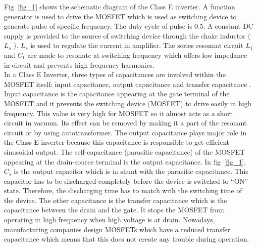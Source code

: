 \documentclass[journal,twoside]{IEEEtran}
\begin{document}
Fig~\ref{fig_1} shows the schematic diagram of the Class E inverter. A
function generator is used to drive the MOSFET which is
used as switching device to generate pulse of specific
frequency. The duty cycle of pulse is 0.5. A constant DC
supply is provided to the source of switching device through
the choke inductor ($L_s$ ). $L_s$ is used to regulate the current in
amplifier. The series resonant circuit $L_1$ and $C_1$ are made to
resonate at switching frequency which offers low impedance
in circuit and prevents high frequency harmonics.\\
In a Class E Inverter, three types of capacitances are involved
within the MOSFET itself:
input capacitance, output
capacitance and transfer capacitance \cite{ClassRadio}. Input capacitance is
the capacitance appearing at the gate terminal of the
MOSFET and it prevents the switching device (MOSFET) to
drive easily in high frequency. This value is very high for
MOSFET so it almost acts as a short circuit in vacuum. Its
effect can be removed by making it a part of the resonant
circuit or by using autotransformer. The output capacitance
plays major role in the Class E inverter because this
capacitance is responsible to get efficient sinusoidal output.
The self-capacitance (parasitic capacitance) of the MOSFET
appearing at the drain-source terminal is the output
capacitance. In fig~\ref{fig_1}, $C_s$ is the output capacitor which is in
shunt with the parasitic capacitance. This capacitor has to be
discharged completely before the device is switched to “ON”
state. Therefore, the discharging time has to match with the
switching time of the device. The other capacitance is the
transfer capacitance which is the capacitance between the drain
and the gate. It stops the MOSFET from operating in high
frequency when high voltage is at drain. Nowadays,
manufacturing companies design MOSFETs which have a
reduced transfer capacitance which means that this does not
create any trouble during operation.\\
\end{document}
